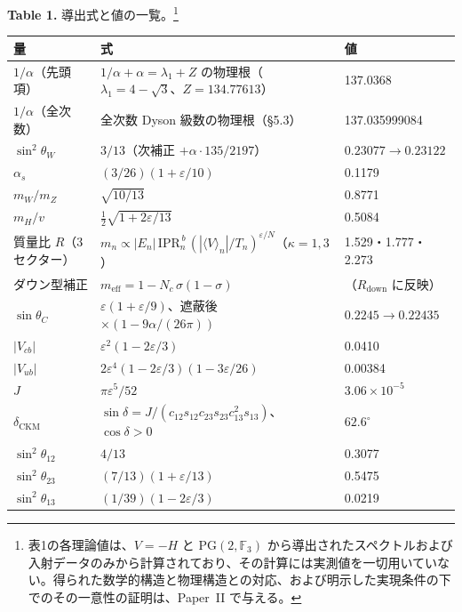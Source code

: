 \documentclass[fontsize=11pt,paper=a4,lualatex]{jlreq}
\begin{document}
\bigskip
\begin{center}\textbf{Table 1.} 導出式と値の一覧。\footnote{表1の各理論値は、$V=-H$ と $\mathrm{PG}(2,\mathbb F_3)$ から導出されたスペクトルおよび入射データのみから計算されており、その計算には実測値を一切用いていない。得られた数学的構造と物理構造との対応、および明示した実現条件の下でのその一意性の証明は、Paper~II で与える。}\end{center}
\nopagebreak[4]\smallskip\nopagebreak[4]
\begin{center}\footnotesize
\begin{tabular}{@{}lll@{}}
\toprule
量 & 式 & 値 \\
\midrule
$1/\alpha$（先頭項） & $1/\alpha + \alpha = \lambda_1 + Z$ の物理根（$\lambda_1 = 4-\sqrt3$、$Z = 134.77613$） & 137.0368 \\
$1/\alpha$（全次数） & 全次数 Dyson 級数の物理根（§5.3） & 137.035999084 \\
$\sin^2\!\theta_W$ & $3/13$（次補正 $+\alpha\cdot 135/2197$） & $0.23077 \to 0.23122$ \\
$\alpha_s$ & $(3/26)(1+\varepsilon/10)$ & 0.1179 \\
$m_W/m_Z$ & $\sqrt{10/13}$ & 0.8771 \\
$m_H/v$ & $\tfrac12\sqrt{1+2\varepsilon/13}$ & 0.5084 \\
質量比 $R$（3セクター） & $m_n \propto |E_n|\,\mathrm{IPR}_n^{\,b}\,(|\langle V\rangle_n|/T_n)^{\varepsilon/N}$（$\kappa = 1, 3$） & 1.529・1.777・2.273 \\
ダウン型補正 & $m_\mathrm{eff} = 1 - N_c\,\sigma(1-\sigma)$ & （$R_\mathrm{down}$ に反映） \\
$\sin\theta_C$ & $\varepsilon(1+\varepsilon/9)$、遮蔽後 $\times(1-9\alpha/(26\pi))$ & $0.2245 \to 0.22435$ \\
$|V_{cb}|$ & $\varepsilon^2(1-2\varepsilon/3)$ & 0.0410 \\
$|V_{ub}|$ & $2\varepsilon^4(1-2\varepsilon/3)(1-3\varepsilon/26)$ & 0.00384 \\
$J$ & $\pi\varepsilon^5/52$ & $3.06\times10^{-5}$ \\
$\delta_\mathrm{CKM}$ & $\sin\delta = J/(c_{12}s_{12}c_{23}s_{23}c_{13}^2 s_{13})$、$\cos\delta>0$ & $62.6^\circ$ \\
$\sin^2\!\theta_{12}$ & $4/13$ & 0.3077 \\
$\sin^2\!\theta_{23}$ & $(7/13)(1+\varepsilon/13)$ & 0.5475 \\
$\sin^2\!\theta_{13}$ & $(1/39)(1-2\varepsilon/3)$ & 0.0219 \\

\end{tabular}
\end{center}
\end{document}
